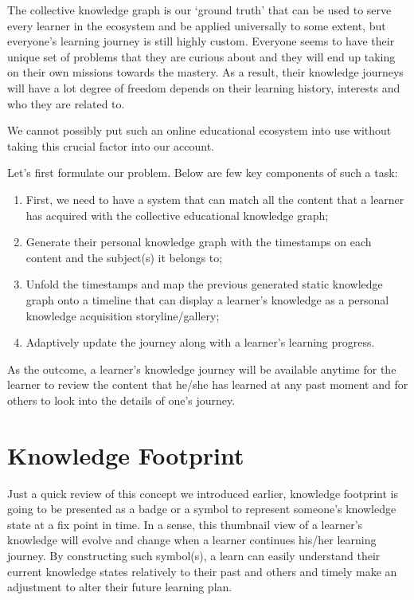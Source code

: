 \documentclass[]{book}
\theoremstyle{definition}
\theoremstyle{definition}
\theoremstyle{definition}
\theoremstyle{remark}
\begin{document}
The collective knowledge graph is our `ground truth' that can be used to
serve every learner in the ecosystem and be applied universally to some
extent, but everyone's learning journey is still highly custom. Everyone
seems to have their unique set of problems that they are curious about
and they will end up taking on their own missions towards the mastery.
As a result, their knowledge journeys will have a lot degree of freedom
depends on their learning history, interests and who they are related
to.

We cannot possibly put such an online educational ecosystem into use
without taking this crucial factor into our account.

Let's first formulate our problem. Below are few key components of such
a task:

\begin{enumerate}
\def\labelenumi{\arabic{enumi}.}
\item
  First, we need to have a system that can match all the content that a
  learner has acquired with the collective educational knowledge graph;
\item
  Generate their personal knowledge graph with the timestamps on each
  content and the subject(s) it belongs to;
\item
  Unfold the timestamps and map the previous generated static knowledge
  graph onto a timeline that can display a learner's knowledge as a
  personal knowledge acquisition storyline/gallery;
\item
  Adaptively update the journey along with a learner's learning
  progress.
\end{enumerate}

As the outcome, a learner's knowledge journey will be available anytime
for the learner to review the content that he/she has learned at any
past moment and for others to look into the details of one's journey.

\section{Knowledge Footprint}\label{knowledge-footprint-1}

Just a quick review of this concept we introduced earlier, knowledge
footprint is going to be presented as a badge or a symbol to represent
someone's knowledge state at a fix point in time. In a sense, this
thumbnail view of a learner's knowledge will evolve and change when a
learner continues his/her learning journey. By constructing such
symbol(s), a learn can easily understand their current knowledge states
relatively to their past and others and timely make an adjustment to
alter their future learning plan.
\end{document}
